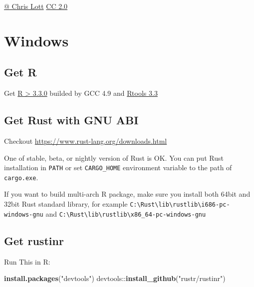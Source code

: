 \documentclass[]{book}
\newenvironment{Shaded}{\begin{snugshade}}{\end{snugshade}}
\newcommand{\KeywordTok}[1]{\textcolor[rgb]{0.13,0.29,0.53}{\textbf{{#1}}}}
\newcommand{\StringTok}[1]{\textcolor[rgb]{0.31,0.60,0.02}{{#1}}}
\newcommand{\NormalTok}[1]{{#1}}
\begin{document}
\href{https://www.flickr.com/photos/fncll/8604144457/in/photolist-xELx44-aeGtnt-xbcPF1-nT2ZFk-o2wrom-xbcZxW-xs1Le9-xELyLn-xsQof6-mL9ndW-59oVCm-2wPrE-ec7aPH-wvX6sc-8pgKJf-9KiRJr-e7juoe-rzsGcV-7oofH7-2wPrn-dVsH5X-hLf6aW-66S3Qg-8G1fuT-2wPrt}{@
Chris Lott}
\href{https://creativecommons.org/licenses/by/2.0/deed.en}{CC 2.0}

\section{Windows}\label{windows}

\subsection{Get R}\label{get-r}

Get
\href{https://cran.r-project.org/bin/windows/base/R-3.3.0beta-win.exe}{R
\textgreater{} 3.3.0} builded by GCC 4.9 and
\href{https://cran.r-project.org/bin/windows/Rtools/Rtools33.exe}{Rtools
3.3}

\subsection{Get Rust with GNU ABI}\label{get-rust-with-gnu-abi}

Checkout \url{https://www.rust-lang.org/downloads.html}

One of stable, beta, or nightly version of Rust is OK. You can put Rust
installation in \texttt{PATH} or set \texttt{CARGO\_HOME} environment
variable to the path of \texttt{cargo.exe}.

If you want to build multi-arch R package, make sure you install both
64bit and 32bit Rust standard library, for example
\texttt{C:\textbackslash{}Rust\textbackslash{}lib\textbackslash{}rustlib\textbackslash{}i686-pc-windows-gnu}
and
\texttt{C:\textbackslash{}Rust\textbackslash{}lib\textbackslash{}rustlib\textbackslash{}x86\_64-pc-windows-gnu}

\subsection{Get rustinr}\label{get-rustinr}

Run This in R:

\begin{Shaded}
\begin{Highlighting}[]
\KeywordTok{install.packages}\NormalTok{(}\StringTok{"devtools"}\NormalTok{)}
\NormalTok{devtools::}\KeywordTok{install_github}\NormalTok{(}\StringTok{"rustr/rustinr"}\NormalTok{)}
\end{Highlighting}
\end{Shaded}
\end{document}
